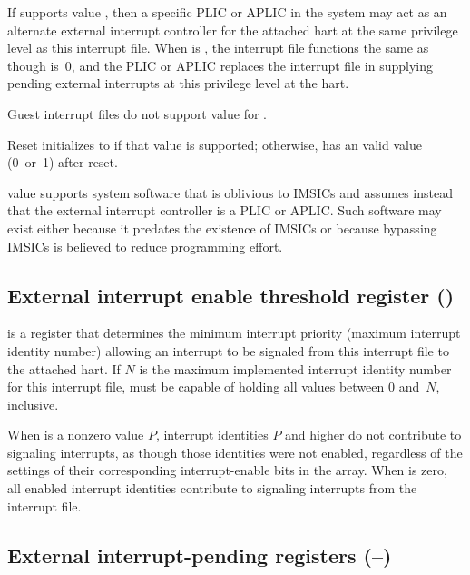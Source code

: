 If  supports value , then a specific PLIC or APLIC
in the system may act as an alternate external interrupt controller for
the attached hart at the same privilege level as this interrupt file.
When  is , the interrupt file functions the
same as though  is~0, and the PLIC or APLIC replaces the interrupt
file in supplying pending external interrupts at this privilege level
at the hart.

Guest interrupt files do not support
value  for .

Reset initializes  to  if that value is
supported;
otherwise,  has an {\unspecified} valid value (0~or~1)
after reset.

\begin{commentary}
 value  supports system software that is
oblivious to IMSICs and assumes instead that the external interrupt
controller is a PLIC or APLIC.
Such software may exist either because it predates the existence of
IMSICs or because bypassing IMSICs is believed to reduce programming
effort.
\end{commentary}

\subsection{External interrupt enable threshold register ()}

 is a {\WLRL} register that determines the minimum
interrupt priority (maximum interrupt identity number) allowing an
interrupt to be signaled from this interrupt file to the attached hart.
If $N$ is the maximum implemented interrupt identity number for this
interrupt file,  must be capable of holding all values
between 0 and~$N$, inclusive.

When  is a nonzero value $P$, interrupt identities $P$
and higher do not contribute to signaling interrupts, as though those
identities were not enabled, regardless of the settings of their
corresponding interrupt-enable bits in the  array.
When  is zero, all enabled interrupt identities
contribute to signaling interrupts from the interrupt file.

\subsection{External interrupt-pending registers (--)}

